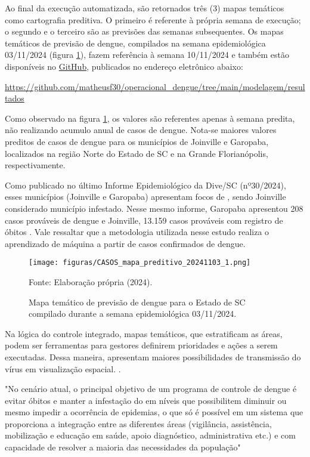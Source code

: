 \indent Ao final da execução automatizada, são retornados três (3) mapas temáticos como cartografia preditiva. O primeiro é referente à própria semana de execução; o segundo e o terceiro são as previsões das semanas subsequentes. Os mapas temáticos de previsão de dengue, compilados na semana epidemiológica 03/11/2024 (figura \ref{fig:previsaoDengue}), fazem referência à semana 10/11/2024 e também estão disponíveis no \href{https://github.com/matheusf30/operacional_dengue/tree/main/modelagem/resultados}{GitHub}, publicados no endereço eletrônico abaixo:
\begin{center}
\url{https://github.com/matheusf30/operacional_dengue/tree/main/modelagem/resultados}
\end{center}

\indent Como observado na figura \ref{fig:previsaoDengue}, os valores são referentes apenas à semana predita, não realizando acumulo anual de casos de dengue. Nota-se maiores valores preditos de casos de dengue para os municípios de Joinville e Garopaba, localizados na região Norte do Estado de \acrlong{SC} e na Grande Florianópolis, respectivamente.

\indent Como publicado no último Informe Epidemiológico da \acrshort{Dive}/\acrshort{SC} (nº30/2024), esses municípios (Joinville e Garopaba) apresentam focos de , sendo Joinville considerado município infestado. Nesse mesmo informe, Garopaba apresentou 208 casos prováveis de dengue e Joinville, 13.159 casos prováveis com registro de óbitos \cite{Informe30DiveSE/24}. Vale ressaltar que a metodologia utilizada nesse estudo realiza o aprendizado de máquina a partir de casos confirmados de dengue. 

\begin{figure}[htbp]
    \begin{center}
    \caption{Mapa temático de previsão de dengue para o Estado de \acrlong{SC} compilado durante a semana epidemiológica 03/11/2024.}
    \label{fig:previsaoDengue}
    \texttt{[image: figuras/CASOS\_mapa\_preditivo\_20241103\_1.png]}
    \end{center}
    \small{Fonte: Elaboração própria (2024).}
\end{figure}

\indent Na lógica do controle integrado, mapas temáticos, que estratificam as áreas, podem ser ferramentas para gestores definirem prioridades e ações a serem executadas. Dessa maneira, apresentam maiores possibilidades de transmissão do vírus em visualização espacial. \cite{Valle2015Dengue}.
\newpage
\begin{citacao}
"No cenário atual, o principal objetivo de um programa de controle de dengue é evitar óbitos e manter a infestação do  em níveis que possibilitem diminuir ou mesmo impedir a ocorrência de epidemias, o que só é possível em um sistema que proporciona a integração entre as diferentes áreas (vigilância, assistência, mobilização e educação em saúde, apoio diagnóstico, administrativa etc.) e com capacidade de resolver a maioria das necessidades da população" \cite[pg-7659]{Valle2015Dengue}
\end{citacao}


